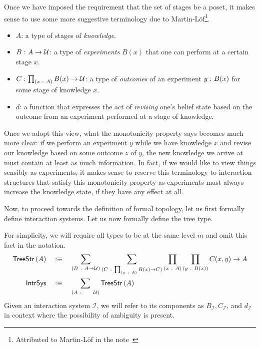 Once we have imposed the requirement that the set of stages be a poset, it makes sense to
use some more suggestive terminology due to Martin-Löf\footnote{Attributed to
  Martin-Löf in the note~\cite{coq-poset}}.
\begin{itemize}
  \item $A$: a type of stages of \emph{knowledge}.
  \item $B\hspace{0.1mm}:\hspace{0.1mm}A \rightarrow \mathcal{U}{}$: a type of \emph{experiments} $B(x)$ that one can perform at a
    certain stage $x$.
  \item $C\hspace{0.1mm}:\hspace{0.1mm}\prod_{(x~:~A)} B(x) \rightarrow \mathcal{U}{}$: a type of \emph{outcomes} of an
    experiment $y\hspace{0.1mm}:\hspace{0.1mm}B(x)$ for some stage of knowledge $x$.
  \item $d$: a function that expresses the act of \emph{revising} one's belief state based
    on the outcome from an experiment performed at a stage of knowledge.
\end{itemize}
Once we adopt this view, what the monotonicity property says becomes much more clear: if
we perform an experiment $y$ while we have knowledge $x$ and revise our knowledge based on
some outcome $z$ of $y$, the new knowledge we arrive at must contain at least as much
information. In fact, if we would like to view things sensibly as experiments, it makes
sense to reserve this terminology to interaction structures that satisfy this monotonicity
property as experiments must always increase the knowledge state, if they have any effect
at all.

Now, to proceed towards the definition of formal topology, let us first formally define
interaction systems.
Let us now formally define the tree type.
\begin{defn}\label{defn:intr-sys}
  For simplicity, we will require all types to be at the same level $m$ and omit this fact
  in the notation.
  \begin{align*}
    \treestr{A} &\quad\is\quad
      \sigmaty{B}{A \rightarrow \univ}{
        \sigmaty{C}{\pity{x}{A}{B(x) \rightarrow C}}{
          \pity{x}{A}{\pity{y}{B(x)}{C(x, y) \rightarrow A}}
        }
      }\\
    \mathsf{IntrSys} &\quad\is\quad \sigmaty{A}{~~~~\univ}{\treestr{A}}
  \end{align*}
  Given an interaction system $\mathcal{I}$, we will refer to its components as
  $B_{\mathcal{I}}, C_{\mathcal{I}}$, and $d_{\mathcal{I}}$ in context where the possibility of
  ambiguity is present.
\end{defn}

